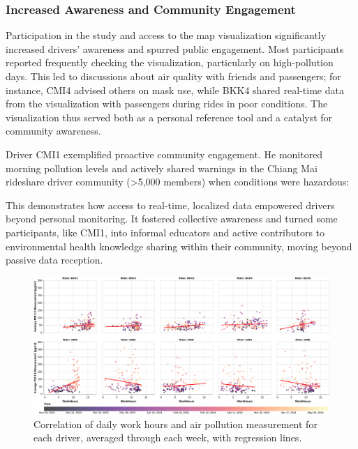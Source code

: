 \subsubsection{Increased Awareness and Community Engagement}
Participation in the study and access to the map visualization significantly increased drivers' awareness and spurred public engagement.
Most participants reported frequently checking the visualization, particularly on high-pollution days.
This led to discussions about air quality with friends and passengers; for instance, CMI4 advised others on mask use, while BKK4 shared real-time data from the visualization with passengers during rides in poor conditions.
The visualization thus served both as a personal reference tool and a catalyst for community awareness.

Driver CMI1 exemplified proactive community engagement.
He monitored morning pollution levels and actively shared warnings in the Chiang Mai rideshare driver community (>5,000 members) when conditions were hazardous:

\qpadding
{}
\qpadding

This demonstrates how access to real-time, localized data empowered drivers beyond personal monitoring.
It fostered collective awareness and turned some participants, like CMI1, into informal educators and active contributors to environmental health knowledge sharing within their community, moving beyond passive data reception.

\begin{figure}
    \centering
    \includegraphics[width=\textwidth]{figures/work-hours-vs-aqi-per-rider-regression.pdf}
    \caption{Correlation of daily work hours and air pollution measurement for each driver, averaged through each week, with regression lines.
    }
    \Description{}
    \label{fig:work-hours-vs-aqi-per-rider}
\end{figure}

